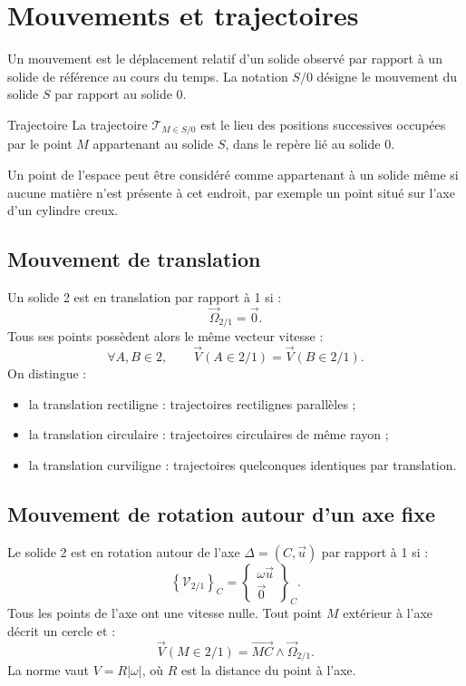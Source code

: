 
\section{Mouvements et trajectoires}
\label{sec:cine-mouvements}

Un mouvement est le déplacement relatif d'un solide observé par rapport
à un solide de référence au cours du temps. La notation $S/0$ désigne
le mouvement du solide $S$ par rapport au solide 0.

\begin{TLCineDef}{Trajectoire}
La trajectoire $\mathcal T_{M\in S/0}$ est le lieu des positions
successives occupées par le point $M$ appartenant au solide $S$, dans
le repère lié au solide 0.
\end{TLCineDef}

Un point de l'espace peut être considéré comme appartenant à un solide
même si aucune matière n'est présente à cet endroit, par exemple un
point situé sur l'axe d'un cylindre creux.

\subsection{Mouvement de translation}

Un solide 2 est en translation par rapport à 1 si :
\[
\boxed{\vec\Omega_{2/1}=\vec0.}
\]
Tous ses points possèdent alors le même vecteur vitesse :
\[
\forall A,B\in2,\qquad
\vec V(A\in2/1)=\vec V(B\in2/1).
\]
On distingue :
\begin{itemize}
  \item la translation rectiligne : trajectoires rectilignes parallèles ;
  \item la translation circulaire : trajectoires circulaires de même rayon ;
  \item la translation curviligne : trajectoires quelconques identiques par translation.
\end{itemize}

\subsection{Mouvement de rotation autour d'un axe fixe}

Le solide 2 est en rotation autour de l'axe $\Delta=(C,\vec u)$ par
rapport à 1 si :
\[
\left\{\mathcal V_{2/1}\right\}_C
=\left\{\begin{array}{c}
\omega\vec u\\\vec0
\end{array}\right\}_C.
\]
Tous les points de l'axe ont une vitesse nulle. Tout point $M$ extérieur
à l'axe décrit un cercle et :
\[
\boxed{\vec V(M\in2/1)=\overrightarrow{MC}\wedge\vec\Omega_{2/1}.}
\]
La norme vaut $V=R|\omega|$, où $R$ est la distance du point à l'axe.

